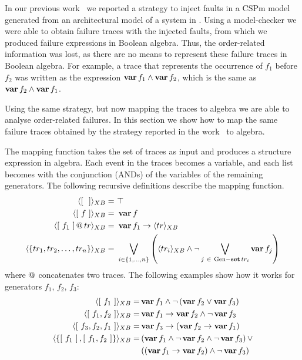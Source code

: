 In our previous work~\cite{DM2012,Didier2012} we reported a strategy to inject faults in a \ac{CSPm} model generated from an architectural model of a system in \simulink.
Using a model-checker we were able to obtain failure traces with the injected faults, from which we produced failure expressions in Boolean algebra.
Thus, the order-related information was lost, as there are no means to represent these failure traces in Boolean algebra.
For example, a trace that represents the occurrence of $f_1$ before $f_2$ was written as the expression $\operatorname{\mathbf{var}} f_1 \land \operatorname{\mathbf{var}} f_2$, which is the same as $\operatorname{\mathbf{var}} f_2 \land \operatorname{\mathbf{var}} f_1$.

Using the same strategy, but now mapping the traces to \ac{algebra} we are able to analyse order-related failures.
In this section we show how to map the same failure traces obtained by the strategy reported in the work~\cite{DM2012} to \ac{algebra}.

The mapping function takes the set of traces as input and produces a structure expression in \ac{algebra}.
Each event in the traces becomes a variable, and each list becomes  with the conjunction (\acp{AND}) of the variables of the remaining generators.
The following recursive definitions describe the mapping function.
%
\begin{subequations}
\begin{align}
\tracetoalgebra{\trace{}} = &~ \top\label{eq:mapping-algebra-empty}\\
%
\tracetoalgebra{\trace{f}} = &~ \var{f}\label{eq:mapping-algebra-singleton}\\
%
\tracetoalgebra{\append{\trace{f_1}}{tr}} = &~
  \xbefore
    {\var{f_1}}
    {\tracetoalgebra{tr}}\label{eq:mapping-algebra-two-more-trace}\\
%
\tracetoalgebra{\left\{ tr_1, tr_2, \ldots, tr_n  \right\}} =&~ 
  \bigvee_{i \in \left\{1,\ldots,n\right\}} 
  \left(\tracetoalgebra{tr_i} \land 
  \lnot \bigvee_{j ~\in~ \generators - \listset{tr_i}} \var{f_j}\right)\label{eq:mapping-algebra-set}
\end{align}
\end{subequations}
%
where $\operatorname{\mathbf{@}}$ concatenates two traces.
The following examples show how it works for generators $f_1$, $f_2$, $f_3$:
%
\begin{subequations}
\begin{align}
\tracetoalgebra{\trace{f_1}} = & \var{f_1} \land \lnot \left(\var{f_2} \lor \var{f_3}\right)\\
%
\tracetoalgebra{\trace{f_1,f_2}} = & \xbefore{\var{f_1}}{\var{f_2}} \land \lnot \var{f_3}\\
%
\tracetoalgebra{\trace{f_3,f_2,f_1}} = & \xbefore{\var{f_3}}{\left(\xbefore{\var{f_2}}{\var{f_1}}\right)}\\
%
\tracetoalgebra{\left\{\trace{f_1},\trace{f_1,f_2}\right\}} = & 
  \left(\var{f_1} \land \lnot \var{f_2} \land \lnot \var{f_3}\right) \lor \nonumber\\
  & \left(\left(\xbefore{\var{f_1}}{\var{f_2}}\right) \land \lnot \var{f_3}\right)
\end{align}
\end{subequations}


